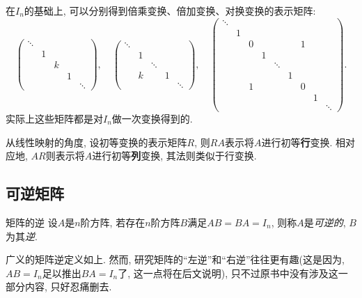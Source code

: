 在$I_n$的基础上, 可以分别得到倍乘变换、倍加变换、对换变换的表示矩阵:$$\left( \begin{smallmatrix}
	\ddots &   &   &  &   \\
	       & 1 &   &  &   \\
	       &   &k  &  &   \\
	       &   &   & 1&   \\
	       &   &   &  &\ddots  
\end{smallmatrix} \right),\quad \left( \begin{smallmatrix}
	\ddots &   &       &  &   \\
	       & 1 &       &  &   \\
	       &   &\ddots &  &   \\
	       & k &       & 1&   \\
	       &   &       &  &\ddots  
\end{smallmatrix} \right),\quad \left( \begin{smallmatrix}
	\ddots &   &   &   &   &   &   &   &   \\
	       & 1 &   &   &   &   &   &   &   \\
	       &   & 0 &   &   &   & 1 &   &   \\
	       &   &   & 1 &   &   &   &   &   \\
	       &   &   &   & \ddots  &   &   &   &   \\
	       &   &   &   &   & 1 &   &   &   \\
	       &   & 1 &   &   &   & 0 &   &   \\
	       &   &   &   &   &   &   & 1 &   \\
	       &   &   &   &   &   &   &   & \ddots
\end{smallmatrix} \right).$$实际上这些矩阵都是对$I_n$做一次变换得到的. 

从线性映射的角度, 设初等变换的表示矩阵$R$, 则$RA$表示将$A$进行初等\textbf{行}变换. 相对应地, $AR$则表示将$A$进行初等\textbf{列}变换, 其法则类似于行变换. 

\subsection{可逆矩阵}

\begin{definition}{矩阵的逆}
	设$A$是$n$阶方阵, 若存在$n$阶方阵$B$满足$AB=BA=I_n$, 则称$A$是\textit{可逆的}, $B$为其\textit{逆}. 
\end{definition}
\begin{remark}
	广义的矩阵逆定义如上. 然而, 研究矩阵的“左逆”和“右逆”往往更有趣(这是因为, $AB=I_n$足以推出$BA=I_n$了, 这一点将在后文说明), 只不过原书中没有涉及这一部分内容, 只好忍痛删去. 
\end{remark}

